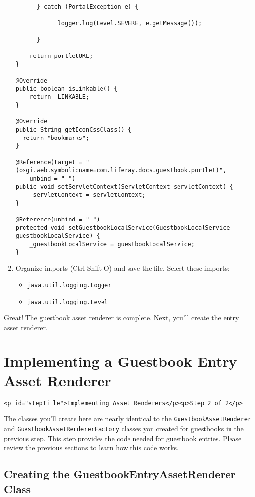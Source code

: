 \begin{enumerate}
\begin{verbatim}
      } catch (PortalException e) {

            logger.log(Level.SEVERE, e.getMessage()); 

      }

    return portletURL;
}

@Override
public boolean isLinkable() {
    return _LINKABLE;
}

@Override
public String getIconCssClass() {
  return "bookmarks";
}

@Reference(target = "(osgi.web.symbolicname=com.liferay.docs.guestbook.portlet)",
    unbind = "-")
public void setServletContext(ServletContext servletContext) {
    _servletContext = servletContext;
}

@Reference(unbind = "-")
protected void setGuestbookLocalService(GuestbookLocalService guestbookLocalService) {
    _guestbookLocalService = guestbookLocalService; 
}
\end{verbatim}
\item
  Organize imports (Ctrl-Shift-O) and save the file. Select these
  imports:

  \begin{itemize}
  \tightlist
  \item
    \texttt{java.util.logging.Logger}
  \item
    \texttt{java.util.logging.Level}
  \end{itemize}
\end{enumerate}

Great! The guestbook asset renderer is complete. Next, you'll create the
entry asset renderer.

\chapter{Implementing a Guestbook Entry Asset
Renderer}\label{implementing-a-guestbook-entry-asset-renderer}

\begin{verbatim}
<p id="stepTitle">Implementing Asset Renderers</p><p>Step 2 of 2</p>
\end{verbatim}

The classes you'll create here are nearly identical to the
\texttt{GuestbookAssetRenderer} and
\texttt{GuestbookAssetRendererFactory} classes you created for
guestbooks in the previous step. This step provides the code needed for
guestbook entries. Please review the previous sections to learn how this
code works.

\section{Creating the GuestbookEntryAssetRenderer
Class}\label{creating-the-guestbookentryassetrenderer-class}

